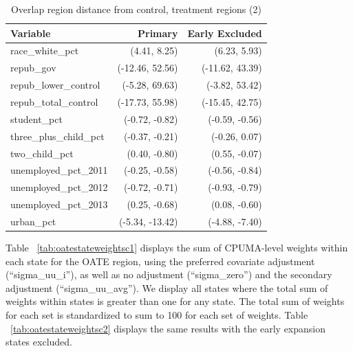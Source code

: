 \documentclass[12pt]{article}
\begin{document}
\begin{table}[ht]
\centering
\begin{tabular}{lrr}
  \toprule
Variable & Primary & Early Excluded \\ 
  \midrule
  race\_white\_pct & (4.41, 8.25) & (6.23, 5.93) \\ 
  repub\_gov & (-12.46, 52.56) & (-11.62, 43.39) \\ 
  repub\_lower\_control & (-5.28, 69.63) & (-3.82, 53.42) \\ 
  repub\_total\_control & (-17.73, 55.98) & (-15.45, 42.75) \\ 
  student\_pct & (-0.72, -0.82) & (-0.59, -0.56) \\ 
  three\_plus\_child\_pct & (-0.37, -0.21) & (-0.26, 0.07) \\ 
  two\_child\_pct & (0.40, -0.80) & (0.55, -0.07) \\ 
  unemployed\_pct\_2011 & (-0.25, -0.58) & (-0.56, -0.84) \\ 
  unemployed\_pct\_2012 & (-0.72, -0.71) & (-0.93, -0.79) \\ 
  unemployed\_pct\_2013 & (0.25, -0.68) & (0.08, -0.60) \\ 
  urban\_pct & (-5.34, -13.42) & (-4.88, -7.40) \\ 
   \bottomrule
\end{tabular}
    \caption{Overlap region distance from control, treatment regions (2)}
    \label{tab:oatedist2}
\end{table}

Table ~\ref{tab:oatestateweightsc1} displays the sum of CPUMA-level weights within each state for the OATE region, using the preferred covariate adjustment (``sigma\_uu\_i''), as well as no adjustment (``sigma\_zero'') and the secondary adjustment (``sigma\_uu\_avg''). We display all states where the total sum of weights within states is greater than one for any state. The total sum of weights for each set is standardized to sum to 100 for each set of weights. Table ~\ref{tab:oatestateweightsc2} displays the same results with the early expansion states excluded.
\end{document}
